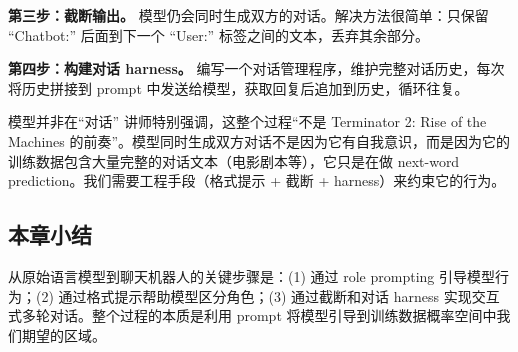 \textbf{第三步：截断输出。} 模型仍会同时生成双方的对话。解决方法很简单：只保留 ``Chatbot:'' 后面到下一个 ``User:'' 标签之间的文本，丢弃其余部分。

\textbf{第四步：构建对话 harness。} 编写一个对话管理程序，维护完整对话历史，每次将历史拼接到 prompt 中发送给模型，获取回复后追加到历史，循环往复。

\begin{warningbox}{模型并非在``对话''}
讲师特别强调，这整个过程``不是 Terminator 2: Rise of the Machines 的前奏''。模型同时生成双方对话不是因为它有自我意识，而是因为它的训练数据包含大量完整的对话文本（电影剧本等），它只是在做 next-word prediction。我们需要工程手段（格式提示 + 截断 + harness）来约束它的行为。
\end{warningbox}

\subsection{本章小结}

从原始语言模型到聊天机器人的关键步骤是：(1) 通过 role prompting 引导模型行为；(2) 通过格式提示帮助模型区分角色；(3) 通过截断和对话 harness 实现交互式多轮对话。整个过程的本质是利用 prompt 将模型引导到训练数据概率空间中我们期望的区域。

